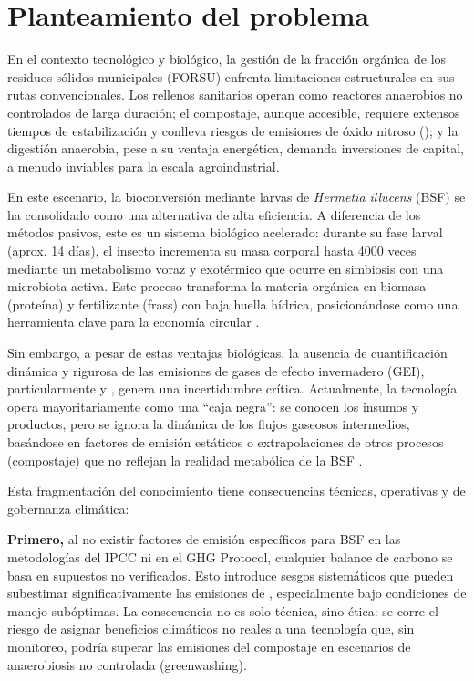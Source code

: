 \section{Planteamiento del problema}

En el contexto tecnológico y biológico, la gestión de la fracción orgánica de los residuos sólidos municipales (FORSU) enfrenta limitaciones estructurales en sus rutas convencionales. Los rellenos sanitarios operan como reactores anaerobios no controlados de larga duración; el compostaje, aunque accesible, requiere extensos tiempos de estabilización y conlleva riesgos de emisiones de óxido nitroso (); y la digestión anaerobia, pese a su ventaja energética, demanda inversiones de capital, a menudo inviables para la escala agroindustrial.

En este escenario, la bioconversión mediante larvas de \textit{Hermetia illucens} (BSF) se ha consolidado como una alternativa de alta eficiencia. A diferencia de los métodos pasivos, este es un sistema biológico acelerado: durante su fase larval (aprox. 14 días), el insecto incrementa su masa corporal hasta 4000 veces mediante un metabolismo voraz y exotérmico que ocurre en simbiosis con una microbiota activa. Este proceso transforma la materia orgánica en biomasa (proteína) y fertilizante (frass) con baja huella hídrica, posicionándose como una herramienta clave para la economía circular \cite{bermudez-serranoComprehensiveUtilizationBlack2023, surendraBioconversionOrganicWastes2016}.

Sin embargo, a pesar de estas ventajas biológicas, la ausencia de cuantificación dinámica y rigurosa de las emisiones de gases de efecto invernadero (GEI), particularmente  y , genera una incertidumbre crítica. Actualmente, la tecnología opera mayoritariamente como una ``caja negra'': se conocen los insumos y productos, pero se ignora la dinámica de los flujos gaseosos intermedios, basándose en factores de emisión estáticos o extrapolaciones de otros procesos (compostaje) que no reflejan la realidad metabólica de la BSF \cite{fuhrmannComprehensiveIndustryrelevantBlack2025a, rossiEstimatingDynamicsGreenhouse2024a}.

Esta fragmentación del conocimiento tiene consecuencias técnicas, operativas y de gobernanza climática:

\textbf{Primero,} al no existir factores de emisión específicos para BSF en las metodologías del IPCC ni en el GHG Protocol, cualquier balance de carbono se basa en supuestos no verificados. Esto introduce sesgos sistemáticos que pueden subestimar significativamente las emisiones de , especialmente bajo condiciones de manejo subóptimas. La consecuencia no es solo técnica, sino ética: se corre el riesgo de asignar beneficios climáticos no reales a una tecnología que, sin monitoreo, podría superar las emisiones del compostaje en escenarios de anaerobiosis no controlada (greenwashing).

